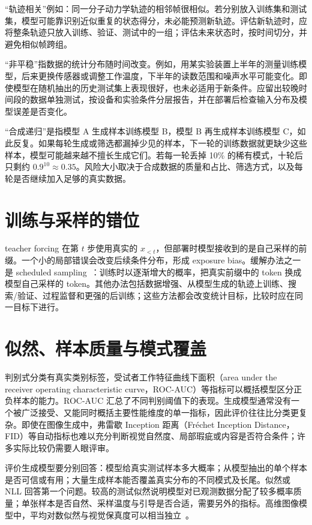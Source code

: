 “轨迹相关”例如：同一分子动力学轨迹的相邻帧很相似。若分别放入训练集和测试集，模型可能靠识别近似重复的状态得分，未必能预测新轨迹。评估新轨迹时，应将整条轨迹只放入训练、验证、测试中的一组；评估未来状态时，按时间切分，并避免相似帧跨组。

“非平稳”指数据的统计分布随时间改变。例如，用某实验装置上半年的测量训练模型，后来更换传感器或调整工作温度，下半年的读数范围和噪声水平可能变化。即使模型在随机抽出的历史测试集上表现很好，也未必适用于新条件。应留出较晚时间段的数据单独测试，按设备和实验条件分层报告，并在部署后检查输入分布及模型误差是否变化。

“合成递归”是指模型 A 生成样本训练模型 B，模型 B 再生成样本训练模型 C，如此反复。如果每轮生成或筛选都漏掉少见的样本，下一轮的训练数据就更缺少这些样本，模型可能越来越不擅长生成它们。若每一轮丢掉 10\% 的稀有模式，十轮后只剩约 \(0.9^{10}\approx0.35\)。风险大小取决于合成数据的质量和占比、筛选方式，以及每轮是否继续加入足够的真实数据。

\section{训练与采样的错位}

teacher forcing 在第 \(t\) 步使用真实的 \(x_{<t}\)，但部署时模型接收到的是自己采样的前缀。一个小的局部错误会改变后续条件分布，形成 exposure bias。缓解办法之一是 scheduled sampling~\cite{bengio2015scheduled}：训练时以逐渐增大的概率，把真实前缀中的 token 换成模型自己采样的 token。其他办法包括数据增强、从模型生成的轨迹上训练、搜索/验证、过程监督和更强的后训练；这些方法都会改变统计目标，比较时应在同一目标下进行。

\section{似然、样本质量与模式覆盖}

判别式分类有真实类别标签，受试者工作特征曲线下面积（area under the receiver operating characteristic curve，ROC-AUC）等指标可以概括模型区分正负样本的能力。ROC-AUC 汇总了不同判别阈值下的表现。生成模型通常没有一个被广泛接受、又能同时概括主要性能维度的单一指标，因此评价往往比分类更复杂。即使在图像生成中，弗雷歇 Inception 距离（Fréchet Inception Distance，FID）等自动指标也难以充分判断视觉自然度、局部瑕疵或内容是否符合条件；许多实际比较仍需要人眼评审。

评价生成模型要分别回答：模型给真实测试样本多大概率；从模型抽出的单个样本是否可信或有用；大量生成样本能否覆盖真实分布的不同模式及长尾。似然或 NLL 回答第一个问题。较高的测试似然说明模型对已观测数据分配了较多概率质量；单张样本是否自然、采样温度与引导是否合适，需要另外的指标。高维图像模型中，平均对数似然与视觉保真度可以相当独立~\cite{theis2016evaluation}。

